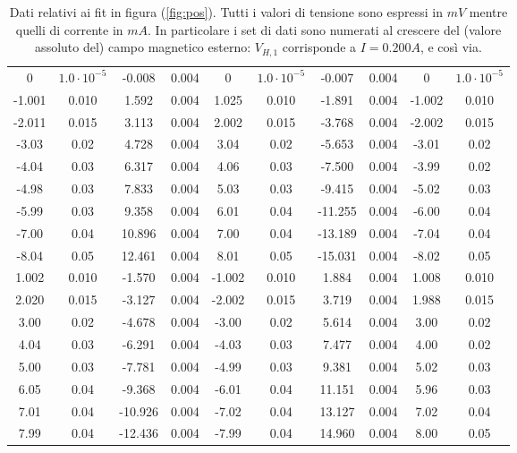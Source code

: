 \begin{table}
\begin{tabular}{cccccccccc}
\hline
0 & $1.0 \cdot 10^{-5}$ & -0.008 & 0.004 & 0 & $1.0 \cdot 10^{-5}$ & -0.007 & 0.004 & 0 & $1.0 \cdot 10^{-5}$\\
-1.001 & 0.010 & 1.592 & 0.004 & 1.025 & 0.010 & -1.891 & 0.004 & -1.002 & 0.010\\
-2.011 & 0.015 & 3.113 & 0.004 & 2.002 & 0.015 & -3.768 & 0.004 & -2.002 & 0.015\\
-3.03 & 0.02 & 4.728 & 0.004 & 3.04 & 0.02 & -5.653 & 0.004 & -3.01 & 0.02\\
-4.04 & 0.03 & 6.317 & 0.004 & 4.06 & 0.03 & -7.500 & 0.004 & -3.99 & 0.02\\
-4.98 & 0.03 & 7.833 & 0.004 & 5.03 & 0.03 & -9.415 & 0.004 & -5.02 & 0.03\\
-5.99 & 0.03 & 9.358 & 0.004 & 6.01 & 0.04 & -11.255 & 0.004 & -6.00 & 0.04\\
-7.00 & 0.04 & 10.896 & 0.004 & 7.00 & 0.04 & -13.189 & 0.004 & -7.04 & 0.04\\
-8.04 & 0.05 & 12.461 & 0.004 & 8.01 & 0.05 & -15.031 & 0.004 & -8.02 & 0.05\\
1.002 & 0.010 & -1.570 & 0.004 & -1.002 & 0.010 & 1.884 & 0.004 & 1.008 & 0.010\\
2.020 & 0.015 & -3.127 & 0.004 & -2.002 & 0.015 & 3.719 & 0.004 & 1.988 & 0.015\\
3.00 & 0.02 & -4.678 & 0.004 & -3.00 & 0.02 & 5.614 & 0.004 & 3.00 & 0.02\\
4.04 & 0.03 & -6.291 & 0.004 & -4.03 & 0.03 & 7.477 & 0.004 & 4.00 & 0.02\\
5.00 & 0.03 & -7.781 & 0.004 & -4.99 & 0.03 & 9.381 & 0.004 & 5.02 & 0.03\\
6.05 & 0.04 & -9.368 & 0.004 & -6.01 & 0.04 & 11.151 & 0.004 & 5.96 & 0.03\\
7.01 & 0.04 & -10.926 & 0.004 & -7.02 & 0.04 & 13.127 & 0.004 & 7.02 & 0.04\\
7.99 & 0.04 & -12.436 & 0.004 & -7.99 & 0.04 & 14.960 & 0.004 & 8.00 & 0.05
\end{tabular}
\caption{Dati relativi ai fit in figura (\ref{fig:pos}). Tutti i valori di tensione sono espressi in $ \unit{mV} $ mentre quelli di corrente in $ \unit{mA} $. In particolare i set di dati sono numerati al crescere del (valore assoluto del) campo magnetico esterno: $ V_{H,1} $ corrisponde a $ I=0.200 \unit{A} $, e così via.}
\label{tab:pos}
\end{table}

